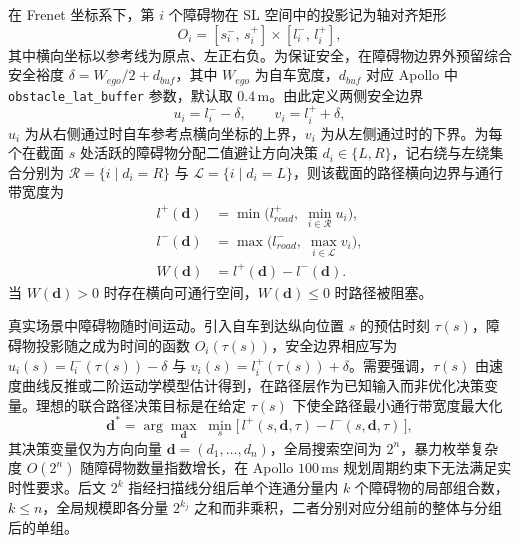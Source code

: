 \documentclass[a4paper,11pt]{ctexart}
\theoremstyle{definition}
\begin{document}
在 Frenet 坐标系下，第 $i$ 个障碍物在 SL 空间中的投影记为轴对齐矩形
\begin{equation}
    O_i = [s_i^{-},\, s_i^{+}] \times [l_i^{-},\, l_i^{+}],
    \label{eq:prob_obs_proj}
\end{equation}
其中横向坐标以参考线为原点、左正右负。为保证安全，在障碍物边界外预留综合安全裕度 $\delta = W_{ego}/2 + d_{buf}$，其中 $W_{ego}$ 为自车宽度，$d_{buf}$ 对应 Apollo 中 \texttt{obstacle\_lat\_buffer} 参数，默认取 $0.4\,\mathrm{m}$。由此定义两侧安全边界
\begin{equation}
    u_i = l_i^{-} - \delta, \qquad v_i = l_i^{+} + \delta,
    \label{eq:prob_uv}
\end{equation}
$u_i$ 为从右侧通过时自车参考点横向坐标的上界，$v_i$ 为从左侧通过时的下界。为每个在截面 $s$ 处活跃的障碍物分配二值避让方向决策 $d_i \in \{L, R\}$，记右绕与左绕集合分别为 $\mathcal{R} = \{i \mid d_i = R\}$ 与 $\mathcal{L} = \{i \mid d_i = L\}$，则该截面的路径横向边界与通行带宽度为
\begin{align}
    l^{+}(\mathbf{d}) &= \min\Big(l_{road}^{+},\; \min_{i \in \mathcal{R}} u_i\Big), \label{eq:prob_upper} \\
    l^{-}(\mathbf{d}) &= \max\Big(l_{road}^{-},\; \max_{i \in \mathcal{L}} v_i\Big), \label{eq:prob_lower} \\
    W(\mathbf{d}) &= l^{+}(\mathbf{d}) - l^{-}(\mathbf{d}). \label{eq:prob_band}
\end{align}
当 $W(\mathbf{d}) > 0$ 时存在横向可通行空间，$W(\mathbf{d}) \le 0$ 时路径被阻塞。

真实场景中障碍物随时间运动。引入自车到达纵向位置 $s$ 的预估时刻 $\tau(s)$，障碍物投影随之成为时间的函数 $O_i(\tau(s))$，安全边界相应写为 $u_i(s) = l_i^{-}(\tau(s)) - \delta$ 与 $v_i(s) = l_i^{+}(\tau(s)) + \delta$。需要强调，$\tau(s)$ 由速度曲线反推或二阶运动学模型估计得到，在路径层作为已知输入而非优化决策变量。理想的联合路径决策目标是在给定 $\tau(s)$ 下使全路径最小通行带宽度最大化
\begin{equation}
    \mathbf{d}^{*} = \arg\max_{\mathbf{d}} \;\min_{s} \big[\,l^{+}(s, \mathbf{d}, \tau) - l^{-}(s, \mathbf{d}, \tau)\,\big],
    \label{eq:prob_joint}
\end{equation}
其决策变量仅为方向向量 $\mathbf{d} = (d_1, \ldots, d_n)$，全局搜索空间为 $2^n$，暴力枚举复杂度 $O(2^n)$ 随障碍物数量指数增长，在 Apollo $100\,\mathrm{ms}$ 规划周期约束下无法满足实时性要求。后文 $2^k$ 指经扫描线分组后单个连通分量内 $k$ 个障碍物的局部组合数，$k \leq n$，全局规模即各分量 $2^{k_j}$ 之和而非乘积，二者分别对应分组前的整体与分组后的单组。
\end{document}
